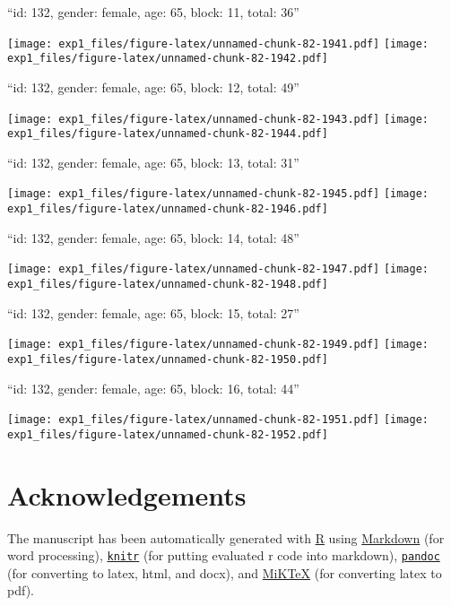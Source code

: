 \documentclass[11pt,,]{article}
\begin{document}
\newpage
[1] 

``id: 132, gender: female, age: 65, block: 11, total: 36''

\texttt{[image: exp1\_files/figure-latex/unnamed-chunk-82-1941.pdf]}
\texttt{[image: exp1\_files/figure-latex/unnamed-chunk-82-1942.pdf]}

\newpage
[1] 

``id: 132, gender: female, age: 65, block: 12, total: 49''

\texttt{[image: exp1\_files/figure-latex/unnamed-chunk-82-1943.pdf]}
\texttt{[image: exp1\_files/figure-latex/unnamed-chunk-82-1944.pdf]}

\newpage
[1] 

``id: 132, gender: female, age: 65, block: 13, total: 31''

\texttt{[image: exp1\_files/figure-latex/unnamed-chunk-82-1945.pdf]}
\texttt{[image: exp1\_files/figure-latex/unnamed-chunk-82-1946.pdf]}

\newpage
[1] 

``id: 132, gender: female, age: 65, block: 14, total: 48''

\texttt{[image: exp1\_files/figure-latex/unnamed-chunk-82-1947.pdf]}
\texttt{[image: exp1\_files/figure-latex/unnamed-chunk-82-1948.pdf]}

\newpage
[1] 

``id: 132, gender: female, age: 65, block: 15, total: 27''

\texttt{[image: exp1\_files/figure-latex/unnamed-chunk-82-1949.pdf]}
\texttt{[image: exp1\_files/figure-latex/unnamed-chunk-82-1950.pdf]}

\newpage
[1] 

``id: 132, gender: female, age: 65, block: 16, total: 44''

\texttt{[image: exp1\_files/figure-latex/unnamed-chunk-82-1951.pdf]}
\texttt{[image: exp1\_files/figure-latex/unnamed-chunk-82-1952.pdf]}

\newpage

\section{Acknowledgements}\label{acknowledgements}

The manuscript has been automatically generated with
\href{http://r-project.org/}{R} using
\href{http://daringfireball.net/projects/markdown/}{Markdown} (for word
processing), \href{http://yihui.name/knitr/}{\texttt{knitr}} (for
putting evaluated r code into markdown),
\href{http://johnmacfarlane.net/pandoc/}{\texttt{pandoc}} (for
converting to latex, html, and docx), and
\href{http://miktex.org/}{MiKTeX} (for converting latex to pdf).
\end{document}
